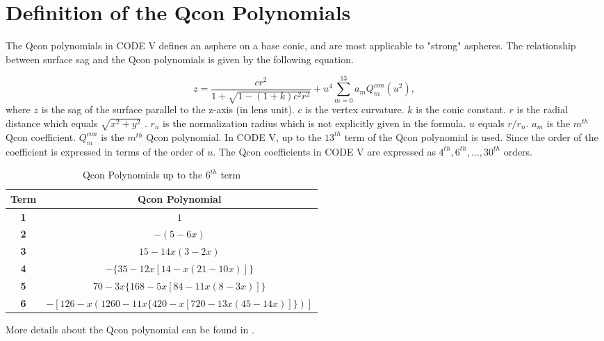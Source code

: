 \newpage

\section{Definition of the Qcon Polynomials} 
\label{apdx: chapter-5-system-Qcon-polynomial}

The Qcon polynomials in CODE V defines an asphere on a base conic, and are most applicable to "strong" aspheres. The relationship between surface sag and the Qcon polynomials is given by the following equation. 

\begin{equation}\label{apdx: Qcon formular}
z = \frac{c{r^2}}{1+\sqrt{1-(1+k){c^2}{r^2}}} + {u^4}\sum\limits_{m=0}^{13} {a_m}Q_{m}^{con}(u^2),
\end{equation}where $z$ is the sag of the surface parallel to the z-axis (in lens unit). $c$ is the vertex curvature. $k$ is the conic constant. $r$ is the radial distance which equals $\sqrt{x^2+y^2}$ . $r_n$ is the normalization radius which is not explicitly given in the formula. $u$ equals $r/r_n$. $a_m$ is the $m^{th}$ Qcon coefficient. $Q^{con}_m$ is the $m^{th}$ Qcon polynomial. In CODE V, up to the $13^{th}$ term of the Qcon polynomial is used. Since the order of the coefficient is expressed in terms of the order of $u$. The Qcon coefficients in CODE V are expressed as $4^{th}, 6^{th}, ..., 30^{th}$ orders.  

\begin{table}[h!]
    \centering
  \captionsetup{justification=centering}
    \caption{Qcon Polynomials up to the $6^{th}$ term}
    \label{apdx table: Qcon Polynomial terms}
    \vspace{-1em}
    \begin{adjustbox}{max width=\textwidth, center}
    \begin{tabular}{c c }
    \hline 
     \textbf{Term} & \textbf{Qcon Polynomial} \\ 
     \hline
      \textbf{1} & $1$ \\
      \textbf{2} & $-(5-6x)$\\
  	  \textbf{3} & $15-14x(3-2x)$	\\
      \textbf{4} & $-\{35-12x[14-x(21-10x)]\}$\\
      \textbf{5} & $70 - 3x\{168 - 5x[84-11x(8-3x)]\}$\\
      \textbf{6} & $-[126-x(1260-11x\{420-x[720-13x(45-14x)]\})]$\\
    \hline
    \end{tabular}
    \end{adjustbox}
\end{table}

More details about the Qcon polynomial can be found in \cite{ForbesOE07}.



